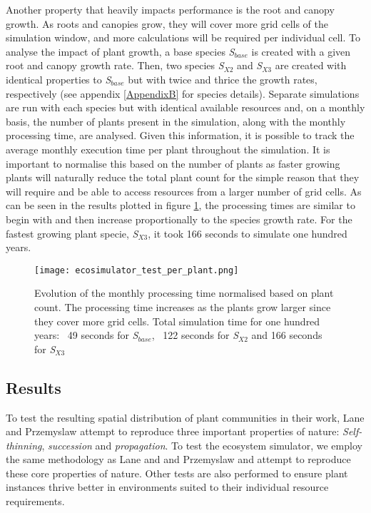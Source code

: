 Another property that heavily impacts performance is the root and canopy growth. As roots and canopies grow, they will cover more grid cells of the simulation window, and more calculations will be required per individual cell. To analyse the impact of plant growth, a base species \textit{S$_{base}$} is created with a given root and canopy growth rate. Then, two species \textit{S$_{X2}$} and \textit{S$_{X3}$} are created with identical properties to \textit{S$_{base}$} but with twice and thrice the growth rates, respectively (see appendix \ref{AppendixB} for species details). Separate simulations are run with each species but with identical available resources and, on a monthly basis, the number of plants present in the simulation, along with the monthly processing time, are analysed. Given this information, it is possible to track the average monthly execution time per plant throughout the simulation. It is important to normalise this based on the number of plants as faster growing plants will naturally reduce the total plant count for the simple reason that they will require and be able to access resources from a larger number of grid cells. As can be seen in the results plotted in figure \ref{fig:ecosimulator_test_per_plant}, the processing times are similar to begin with and then increase proportionally to the species growth rate. For the fastest growing plant specie, \textit{S$_{X3}$}, it took 166 seconds to simulate one hundred years.

\begin{figure}
\center
	\texttt{[image: ecosimulator\_test\_per\_plant.png]}
	\caption{ Evolution of the monthly processing time normalised based on plant count. The processing time increases as the plants grow larger since they cover more grid cells. Total simulation time for one hundred years: ~49 seconds for \textit{S$_{base}$}, ~122 seconds for \textit{S$_{X2}$} and 166 seconds for \textit{S$_{X3}$}}
	\label{fig:ecosimulator_test_per_plant}
\end{figure}

\subsection{Results} \label{subsec:ecosystem_simulator_results}

To test the resulting spatial distribution of plant communities in their work, Lane and Przemyslaw \cite{Lane2002} attempt to reproduce three important properties of nature: \textit{Self-thinning}, \textit{succession} and \textit{propagation}. To test the ecosystem simulator, we employ the same methodology as Lane and and Przemyslaw \cite{Lane2002} and attempt to reproduce these core properties of nature. Other tests are also performed to ensure plant instances thrive better in environments suited to their individual resource requirements.\\

